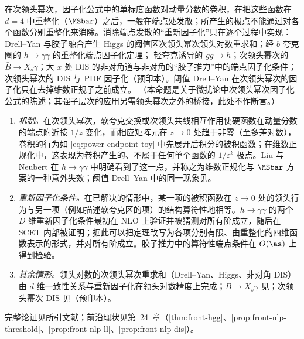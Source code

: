 \begin{proposition}\label{prop:power-nlp-endpoint}
在次领头幂次，因子化公式中的单标度函数对动量分数的卷积，在把这些函数在 $d=4$ 中重整化（$\MSbar$）之后，一般在端点处发散；所产生的极点不能通过对各个函数分别重整化来消除。消除端点发散的“重新因子化”只在逐个过程中实现：Drell--Yan 与胶子融合产生 Higgs 的阈值区次领头幂次领头对数重求和\cite{Beneke:2018gvs,Beneke:2019mua}；经 $b$ 夸克圈的 $h\to\gamma\gamma$ 的重整化端点因子化定理\cite{Liu:2019oav,Liu:2020wbn}；%
轻夸克诱导的 $gg\to h$\cite{Liu:2022ajh}；次领头幂次的 $\bar B\to X_s\gamma$\cite{Hurth:2023paz}；大 $x$ 处 DIS 的非对角道\cite{Beneke:2020ibj}与非对角的“胶子推力”中的端点因子化条件\cite{Beneke:2022obx}；次领头幂次的 DIS 与 PDF 因子化\cite{Beneke:2026miy}（预印本）。阈值 Drell--Yan 在次领头幂次的因子化只在去掉维数正规子之前成立\cite{Beneke:2019oqx}。
（本命题是关于微扰论中次领头幂次因子化公式的陈述；其强子层次的应用另需领头幂次之外的桥接，此处不作断言。）
\end{proposition}

\begin{proofsketch}
\begin{enumerate}[label=\arabic*.,leftmargin=1.6em,itemsep=1pt,topsep=2pt]
\item \emph{机制。}在次领头幂次，软夸克交换或次领头共线相互作用使硬函数在动量分数的端点附近按 $1/z$ 变化，而相应矩阵元在 $z\to0$ 处趋于非零（至多差对数），卷积的行为如 \eqref{eq:power-endpoint-toy} 中先展开后积分的被积函数；在维数正规化中，这表现为卷积产生的、不属于任何单个函数的 $1/\varepsilon^k$ 极点。Liu 与 Neubert 在 $h\to\gamma\gamma$ 中明确看到了这一点，并称之为维数正规化与 $\MSbar$ 方案的一种意外失效\cite{Liu:2019oav}；阈值 Drell--Yan 中的同一现象见\cite{Beneke:2019oqx}。
\item \emph{重新因子化条件。}在已解决的情形中，某一项的被积函数在 $z\to0$ 处的领头行为与另一项（例如描述软夸克区的项）的结构算符性地相等。$h\to\gamma\gamma$ 的两个 $D$ 维重新因子化条件最初在 NLO 上验证并被猜测对所有阶成立\cite{Liu:2019oav}，随后在 SCET 内部被证明\cite[第~3~节]{Liu:2020wbn}；据此可以把定理改写为各项分别有限、由重整化的四维函数表示的形式，并对所有阶成立\cite{Liu:2020wbn}。胶子推力中的算符性端点条件在 $O(\as)$ 上得到检验\cite{Beneke:2022obx}。
\item \emph{其余情形。}领头对数的次领头幂次重求和（Drell--Yan、Higgs、非对角 DIS）由 $d$ 维一致性关系与重新因子化在领头对数精度上完成\cite{Beneke:2018gvs,Beneke:2019mua,Beneke:2020ibj}；$\bar B\to X_s\gamma$ 见\cite{Hurth:2023paz}；次领头幂次 DIS 见\cite{Beneke:2026miy}（预印本）。
\end{enumerate}
完整论证见所引文献；前沿现状见第~24~章（\cref{thm:front-hgg}、\cref{prop:front-nlp-threshold}、\cref{prop:front-nlp-ll}、\cref{prop:front-nlp-dis}）。
\end{proofsketch}

